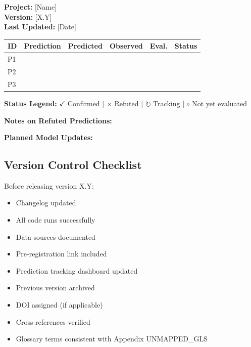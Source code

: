 \begin{tcolorbox}[colback=gray!5!white, colframe=gray!75!black,
    title=\textbf{EBF Prediction Tracking Dashboard}]

\textbf{Project:} [Name] \\
\textbf{Version:} [X.Y] \\
\textbf{Last Updated:} [Date]

\vspace{0.5em}

\begin{tabular}{@{}lccccl@{}}
\toprule
\textbf{ID} & \textbf{Prediction} & \textbf{Predicted} & \textbf{Observed} & \textbf{Eval.} & \textbf{Status} \\
\midrule
P1 & & & & & \\
P2 & & & & & \\
P3 & & & & & \\
\bottomrule
\end{tabular}

\vspace{0.5em}

\textbf{Status Legend:}
$\checkmark$ Confirmed |
$\times$ Refuted |
$\circlearrowright$ Tracking |
$\circ$ Not yet evaluated

\textbf{Notes on Refuted Predictions:}

\textbf{Planned Model Updates:}

\end{tcolorbox}

\subsection{Version Control Checklist}

\begin{tcolorbox}[colback=gray!5!white, colframe=gray!75!black,
    title=\textbf{EBF Version Release Checklist}]

Before releasing version X.Y:

\begin{itemize}
    \item[$\square$] Changelog updated
    \item[$\square$] All code runs successfully
    \item[$\square$] Data sources documented
    \item[$\square$] Pre-registration link included
    \item[$\square$] Prediction tracking dashboard updated
    \item[$\square$] Previous version archived
    \item[$\square$] DOI assigned (if applicable)
    \item[$\square$] Cross-references verified
    \item[$\square$] Glossary terms consistent with Appendix UNMAPPED_GLS
\end{itemize}

\end{tcolorbox}


